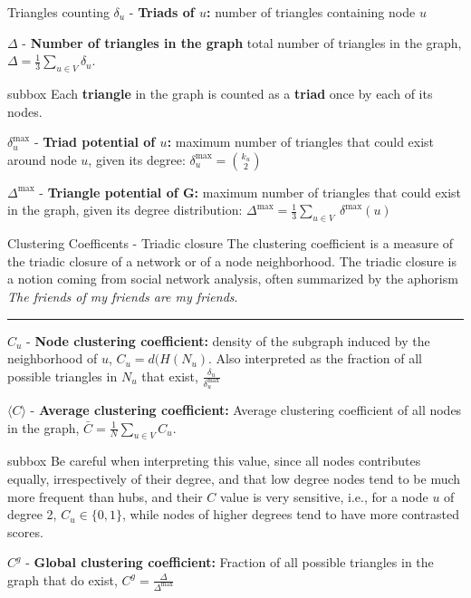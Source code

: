 \begin{textbox}{Triangles counting}
    $\delta_u$ - \textbf{Triads of $u$:} number of triangles containing node $u$

    $\Delta$ - \textbf{Number of triangles in the graph} total number of triangles in the graph, $\Delta=\frac{1}{3}\sum_{u\in V}\delta_u$.

    \begin{subbox}{subbox}{}
        \tiny{Each \textbf{triangle} in the graph is counted as a \textbf{triad} once by each of its nodes. }
    \end{subbox}

    $\delta^{\max}_u$ - \textbf{Triad potential of $u$:} maximum number of triangles that could exist around node $u$, given its degree: $\delta^{\max}_u=\binom {k_{u}}{2}$

    $\Delta^{\max}$ - \textbf{Triangle potential of G:} maximum number of triangles that could exist in the graph, given its degree distribution: $\Delta^{\max}=\frac {1}{3}\sum_{u\in V}\ \delta^{\max} (u)$
\end{textbox}


\begin{textbox}{Clustering Coefficents - Triadic closure}
    The clustering coefficient is a measure of the triadic closure of a network or of a node neighborhood. The triadic closure is a notion coming from social network analysis, often summarized by the aphorism \textit{The friends of my friends are my friends}.

    \noindent\rule{4cm}{0.1pt}

    $C_u$ - \textbf{Node clustering coefficient:} density of the subgraph induced by the neighborhood of $u$, $C_u = d(H(N_u)$. Also interpreted as the fraction of all possible triangles in $N_u$ that exist, $\frac{\delta_u}{\delta^{\max}_u}$

    $\langle C \rangle$ - \textbf{Average clustering coefficient:} Average clustering coefficient of all nodes in the graph, $\bar C = \frac{1}{N}\sum_{u \in V} C_u$.\\

    \begin{subbox}{subbox}{}
        \tiny{Be careful when interpreting this value, since all nodes contributes equally, irrespectively of their degree, and that low degree nodes tend to be much more frequent than hubs, and their $C$ value is very sensitive, i.e., for a node $u$ of degree 2, $C_u \in \{0,1\}$, while nodes of higher degrees tend to have more contrasted scores.}
    \end{subbox}

    $C^g$ - \textbf{Global clustering coefficient:} Fraction of all possible triangles in the graph that do exist, $C^g= \frac{\Delta}{\Delta^{\max}} $
\end{textbox}


